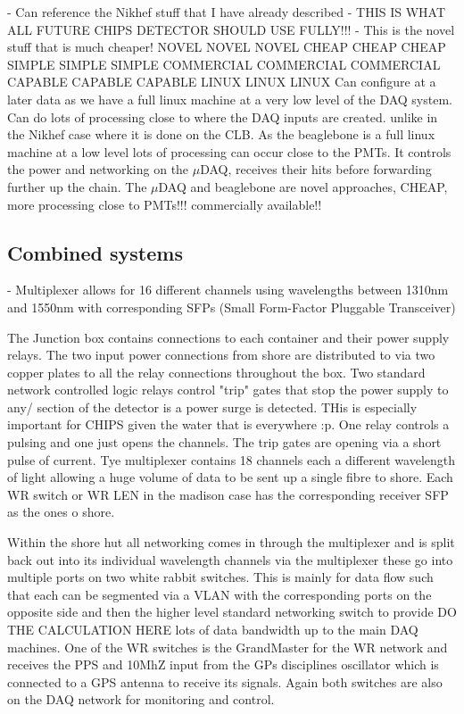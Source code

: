 - Can reference the Nikhef stuff that I have already described - THIS IS WHAT ALL FUTURE CHIPS
DETECTOR SHOULD USE FULLY!!! - This is the novel stuff that is much cheaper! NOVEL NOVEL NOVEL
CHEAP CHEAP CHEAP SIMPLE SIMPLE SIMPLE COMMERCIAL COMMERCIAL COMMERCIAL CAPABLE CAPABLE CAPABLE
LINUX LINUX LINUX Can configure at a later data as we have a full linux machine at a very low
level of the DAQ system. Can do lots of processing close to where the DAQ inputs are created.
unlike in the Nikhef case where it is done on the CLB. As the beaglebone is a full linux machine
at a low level lots of processing can occur close to the PMTs. It controls the power and
networking on the $\mu$DAQ, receives their hits before forwarding further up the chain. The
$\mu$DAQ and beaglebone are novel approaches, CHEAP, more processing close to PMTs!!! commercially
available!!

\subsection{Combined systems} %
\label{sec:daq_hard_combined} %

- Multiplexer allows for 16 different channels using wavelengths between 1310nm and 1550nm with
corresponding SFPs (Small Form-Factor Pluggable Transceiver)

The Junction box contains connections to each container and their power supply relays. The two
input power connections from shore are distributed to via two copper plates to all the relay
connections throughout the box. Two standard network controlled logic relays control "trip" gates
that stop the power supply to any/ section of the detector is a power surge is detected. THis is
especially important for CHIPS given the water that is everywhere :p. One relay controls a pulsing
and one just opens the channels. The trip gates are opening via a short pulse of current. Tye
multiplexer contains 18 channels each a different wavelength of light allowing a huge volume of
data to be sent up a single fibre to shore. Each WR switch or WR LEN in the madison case has the
corresponding receiver SFP as the ones o shore.

Within the shore hut all networking comes in through the multiplexer and is split back out into its
individual wavelength channels via the multiplexer these go into multiple ports on two white
rabbit switches. This is mainly for data flow such that each can be segmented via a VLAN with the
corresponding ports on the opposite side and then the higher level standard networking switch to
provide DO THE CALCULATION HERE lots of data bandwidth up to the main DAQ machines. One of the WR
switches is the GrandMaster for the WR network and receives the PPS and 10MhZ input from the GPs
disciplines oscillator which is connected to a GPS antenna to receive its signals. Again both
switches are also on the DAQ network for monitoring and control.

